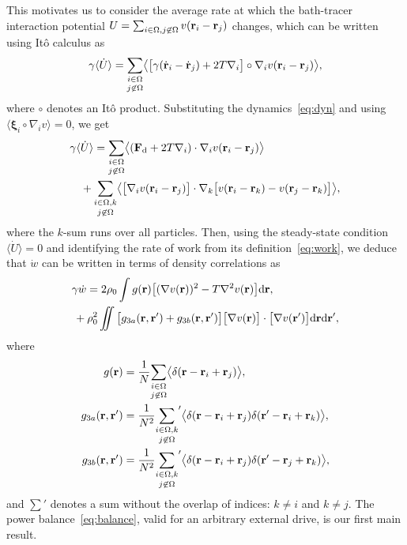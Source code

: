 \documentclass[superscriptaddress, twocolumn, prx, longbibliography, nofootinbib]{revtex4-1}
\newcommand{\dd}{\text{d}}
\begin{document}
This motivates us to consider the average rate at which the bath-tracer interaction potential $U = \sum_{i\in\Omega,j\not\in\Omega} v({\bf r}_i-{\bf r}_j)$ changes, which can be written using It\^o calculus as
\begin{equation}
	\gamma\langle\dot U \rangle = \underset{j\not\in\Omega}{\sum_{i\in\Omega}} \big\langle\big[\gamma(\dot{\bf r}_i - \dot{\bf r}_j) + 2 T \nabla_i\big] \circ \nabla_i v({\bf r}_i-{\bf r}_j)\big\rangle ,
\end{equation}
where $\circ$ denotes an It\^o product. Substituting the dynamics~\eqref{eq:dyn} and using $\langle{\boldsymbol\xi}_i\circ\nabla_i v\rangle=0$, we get
\begin{equation}\label{eq:dotU}
	\begin{aligned}
		\gamma\langle&\dot U \rangle = \underset{j\not\in\Omega}{\sum_{i\in\Omega}} \big\langle({\bf F}_{\rm d} + 2 T \nabla_i) \cdot \nabla_i v({\bf r}_i-{\bf r}_j)\big\rangle
		\\
		& + \underset{j\not\in\Omega}{\sum_{i\in\Omega,k}} \big\langle \big[\nabla_i v({\bf r}_i-{\bf r}_j)\big]\cdot \nabla_k \big[ v({\bf r}_i-{\bf r}_k) - v({\bf r}_j-{\bf r}_k) \big] \big\rangle ,
    \end{aligned}
\end{equation}
where the $k$-sum runs over all particles. Then, using the steady-state condition $\langle\dot U \rangle=0$ and identifying the rate of work from its definition~\eqref{eq:work}, we deduce that $\dot w$ can be written in terms of density correlations as
\begin{equation}\label{eq:balance}
	\begin{aligned}
		&\gamma\dot w = 2\rho_0 \int g({\bf r}) \big[(\nabla v({\bf r}))^2 - T \nabla^2 v({\bf r})\big] \dd{\bf r} ,
		\\
		&\, + \rho_0^2 \iint\big[ g_{3a}({\bf r}, {\bf r}') + g_{3b}({\bf r}, {\bf r}')\big]  \big[\nabla v({\bf r})\big] \cdot \big[\nabla v({\bf r}')\big] \dd{\bf r} \dd{\bf r}' ,
	\end{aligned}
\end{equation}
where
\begin{equation}
	\begin{aligned}
 		g({\bf r}) &= \frac{1}{N} \underset{j\not\in\Omega}{\sum_{i\in\Omega}} \big\langle \delta({\bf r}-{\bf r}_i+{\bf r}_j)\big\rangle ,
		\\
 		g_{3a}({\bf r},{\bf r}') &= \frac{1}{N^2} \underset{j\not\in\Omega}{\sum_{i\in\Omega,k}}' \big\langle \delta({\bf r}-{\bf r}_i+{\bf r}_j) \delta({\bf r}'-{\bf r}_i+{\bf r}_k)\big\rangle ,
		\\
 		g_{3b}({\bf r},{\bf r}') &= \frac{1}{N^2} \underset{j\not\in\Omega}{\sum_{i\in\Omega,k}}' \big\langle \delta({\bf r}-{\bf r}_i+{\bf r}_j) \delta({\bf r}'-{\bf r}_j+{\bf r}_k)\big\rangle ,
	\end{aligned}
\end{equation}
and $\sum'$ denotes a sum without the overlap of indices: $k\neq i$ and $k\neq j$. The power balance~\eqref{eq:balance}, valid for an arbitrary external drive, is our first main result.
\end{document}

